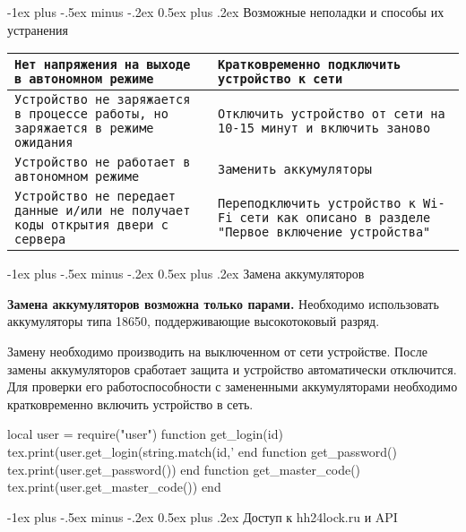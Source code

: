 \documentclass[a4paper,10pt,landscape]{article}
\makeatletter
\renewcommand{\section}{\@startsection{section}{1}{0mm}%
                                {-1ex plus -.5ex minus -.2ex}%
                                {0.5ex plus .2ex}%
                                {\normalfont\large\bfseries}}
\makeatother
\begin{document}
\begin{multicols}{3}
\section{Возможные неполадки и способы их устранения}

\noindent\begin{tabular}{p{4cm}|p{4cm}}
\hline
\texttt{Нет напряжения на выходе в автономном режиме}&\texttt{Кратковременно подключить устройство к сети}\\
\hline
\texttt{Устройство не заряжается в процессе работы, но заряжается в режиме ожидания}&\texttt{Отключить устройство от сети на 10-15 минут и включить заново}\\
\hline
\texttt{Устройство не работает в автономном режиме}&\texttt{Заменить аккумуляторы}\\
\hline
\texttt{Устройство не передает данные и/или не получает коды открытия двери с сервера}&\texttt{Переподключить устройство к Wi-Fi сети как описано в разделе "Первое включение устройства"}\\
\hline
\end{tabular}

\section{Замена аккумуляторов}

\textbf{Замена аккумуляторов возможна только парами.} Необходимо использовать аккумуляторы типа 18650, поддерживающие высокотоковый разряд. 

Замену необходимо производить на выключенном от сети устройстве. После замены аккумуляторов сработает защита и устройство автоматически отключится. Для проверки его работоспособности с замененными аккумуляторами необходимо кратковременно включить устройство в сеть. 

\begin{luacode}
local user = require("user")
	function get_login(id)
		tex.print(user.get_login(string.match(id,'%
	end
	function get_password()
		tex.print(user.get_password())
	end
	function get_master_code()
		tex.print(user.get_master_code())
	end
\end{luacode}

\section{Доступ к hh24lock.ru и API}


\end{multicols}
\end{document}
